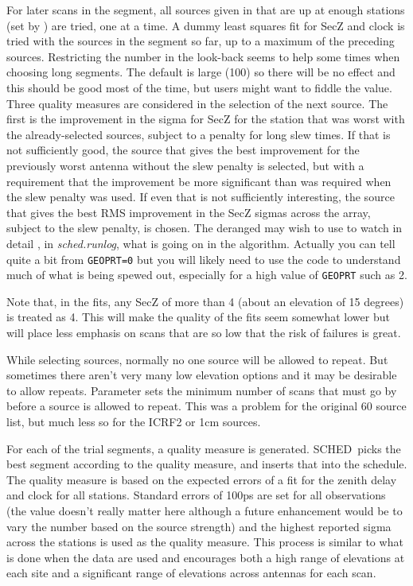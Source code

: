 \documentclass{report}
\newcommand{\schedb}{{\sc SCHED~}}
\begin{document}
For later scans in the segment, all sources given in  that are up at enough stations (set by
) are tried, one at a time.  A
dummy least squares fit for SecZ and clock is tried with the sources
in the segment so far, up to a maximum of the preceding  sources.  Restricting the number in the
look-back seems to help some times when choosing long segments.  The
default is large (100) so there will be no effect and this should be
good most of the time, but users might want to fiddle the value.
Three quality measures are considered in the selection of the next
source.  The first is the improvement in the sigma for SecZ for the
station that was worst with the already-selected sources, subject to a
penalty for long slew times.  If that is not sufficiently good, the
source that gives the best improvement for the previously worst
antenna without the slew penalty is selected, but with a requirement
that the improvement be more significant than was required when the
slew penalty was used.  If even that is not sufficiently interesting,
the source that gives the best RMS improvement in the SecZ sigmas
across the array, subject to the slew penalty, is chosen.  The
deranged may wish to use  to watch in
detail , in {\sl sched.runlog}, what is going on in the algorithm.  
Actually you can tell quite
a bit from {\tt GEOPRT=0} but you will likely need to use the code to
understand much of what is being spewed out, especially for a high
value of {\tt GEOPRT} such as 2.

Note that, in the fits, any SecZ of more than 4 (about an elevation of
15 degrees) is treated as 4.  This will make the quality of the fits
seem somewhat lower but will place less emphasis on scans that are so
low that the risk of failures is great.

While selecting sources, normally no one source will be allowed to
repeat.  But sometimes there aren't very many low elevation options
and it may be desirable to allow repeats.  Parameter  sets the minimum number of scans that must go by
before a source is allowed to repeat.  This was a problem for the
original 60 source list, but much less so for the ICRF2 or 1cm sources.

For each of the  trial segments,
a quality measure is generated.  \schedb picks the best segment
according to the quality measure, and inserts that into the schedule.
The quality measure is based on the expected errors of a fit for the
zenith delay and clock for all stations.  Standard errors of 100ps are
set for all observations (the value doesn't really matter here
although a future enhancement would be to vary the number based on the
source strength) and the highest reported sigma across the stations is
used as the quality measure.  This process is similar to what is done
when the data are used and encourages both a high range of elevations
at each site and a significant range of elevations across antennas for
each scan.
\end{document}
